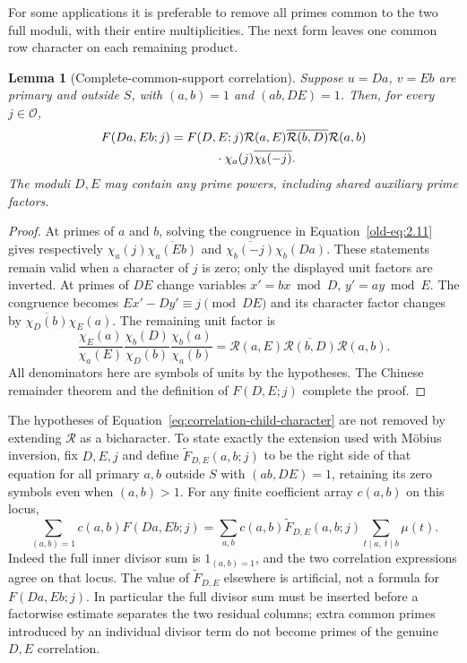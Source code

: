 \documentclass[11pt,a4paper]{article}
\numberwithin{equation}{section}
\numberwithin{figure}{section}
\newtheorem{lemma}[theorem]{Lemma}
\theoremstyle{definition}
\theoremstyle{remark}
\begin{document}
For some applications it is preferable to remove all primes common to the
two full moduli, with their entire multiplicities.  The next form leaves one
common row character on each remaining product.

\begin{lemma}[Complete-common-support correlation]
\label{lem:complete-support-correlation}
Suppose $u=Da$, $v=Eb$ are primary and outside $S$, with
$(a,b)=1$ and $(ab,DE)=1$.  Then, for every $j\in\mathcal O$,
\begin{equation}
 \begin{split}
 F(Da,Eb;j)={}&F(D,E;j)\mathcal R(a,E)
       \overline{\mathcal R(b,D)}\mathcal R(a,b)\\
 &\hspace{8mm}\cdot\chi_a(j)\overline{\chi_b(-j)}.
 \end{split}
 \label{eq:correlation-child-character}
\end{equation}
The moduli $D,E$ may contain any prime powers, including shared auxiliary
prime factors.
\end{lemma}

\begin{proof}
At primes of $a$ and $b$, solving the congruence in
Equation~\eqref{old-eq:2.11} gives respectively
$\chi_a(j)\overline{\chi_a(Eb)}$ and
$\overline{\chi_b(-j)}\chi_b(Da)$.  These statements remain valid when a
character of $j$ is zero; only the displayed unit factors are inverted.
At primes of $DE$ change variables $x'=bx\bmod D$, $y'=ay\bmod E$.
The congruence becomes $Ex'-Dy'\equiv j\pmod{DE}$ and its character factor
changes by $\overline{\chi_D(b)}\chi_E(a)$.  The remaining unit factor is
\[
 \frac{\chi_E(a)}{\chi_a(E)}
 \frac{\chi_b(D)}{\chi_D(b)}
 \frac{\chi_b(a)}{\chi_a(b)}
 =\mathcal R(a,E)\overline{\mathcal R(b,D)}\mathcal R(a,b).
\]
All denominators here are symbols of units by the hypotheses.  The Chinese
remainder theorem and the definition of $F(D,E;j)$ complete the proof.
\end{proof}

The hypotheses of Equation~\eqref{eq:correlation-child-character} are not
removed by extending $\mathcal R$ as a bicharacter.  To state exactly the
extension used with M\"obius inversion, fix $D,E,j$ and define
$\widetilde F_{D,E}(a,b;j)$ to be the right side of that equation for all
primary $a,b$ outside $S$ with $(ab,DE)=1$, retaining its zero symbols even
when $(a,b)>1$.  For any finite coefficient array $c(a,b)$ on this locus,
\[
 \sum_{(a,b)=1}c(a,b)F(Da,Eb;j)
 =\sum_{a,b}c(a,b)\widetilde F_{D,E}(a,b;j)
                \sum_{t\mid a,\ t\mid b}\mu(t).
\]
Indeed the full inner divisor sum is $1_{(a,b)=1}$, and the two correlation
expressions agree on that locus.  The value of $\widetilde F_{D,E}$ elsewhere
is artificial, not a formula for $F(Da,Eb;j)$.  In particular the full
divisor sum must be inserted before a factorwise estimate separates the two
residual columns; extra common primes introduced by an individual divisor
term do not become primes of the genuine $D,E$ correlation.
\end{document}
